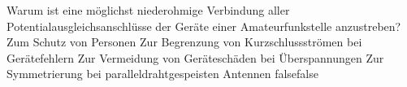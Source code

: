     {Warum ist eine möglichst niederohmige Verbindung aller Potentialausgleichsanschlüsse der Geräte einer Amateurfunkstelle anzustreben?}
    {Zum Schutz von Personen}
    {Zur Begrenzung von Kurzschlussströmen bei Gerätefehlern}
    {Zur Vermeidung von Geräteschäden bei Überspannungen}
    {Zur Symmetrierung bei paralleldrahtgespeisten Antennen}
    {false}{false}